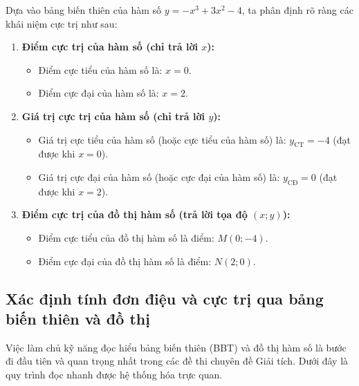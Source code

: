 \documentclass[12pt]{article}
\begin{document}
	\begin{loigiai}
		Dựa vào bảng biến thiên của hàm số $y = -x^3 + 3x^2 - 4$, ta phân định rõ ràng các khái niệm cực trị như sau:
		
		\begin{enumerate}[label=\arabic*.]
			\item \textbf{Điểm cực trị của hàm số (chỉ trả lời $x$):}
			\begin{itemize}
				\item Điểm cực tiểu của hàm số là: $x = 0$.
				\item Điểm cực đại của hàm số là: $x = 2$.
			\end{itemize}
			
			\item \textbf{Giá trị cực trị của hàm số (chỉ trả lời $y$):}
			\begin{itemize}
				\item Giá trị cực tiểu của hàm số (hoặc cực tiểu của hàm số) là: $y_{\text{CT}} = -4$ (đạt được khi $x = 0$).
				\item Giá trị cực đại của hàm số (hoặc cực đại của hàm số) là: $y_{\text{CĐ}} = 0$ (đạt được khi $x = 2$).
			\end{itemize}
			
			\item \textbf{Điểm cực trị của đồ thị hàm số (trả lời tọa độ $(x;y)$):}
			\begin{itemize}
				\item Điểm cực tiểu của đồ thị hàm số là điểm: $M(0; -4)$.
				\item Điểm cực đại của đồ thị hàm số là điểm: $N(2; 0)$.
			\end{itemize}
		\end{enumerate}
	\end{loigiai}
	
	
	\subsection{Xác định tính đơn điệu và cực trị qua bảng biến thiên và đồ thị}
	
	Việc làm chủ kỹ năng đọc hiểu bảng biến thiên (BBT) và đồ thị hàm số là bước đi đầu tiên và quan trọng nhất trong các đề thi chuyên đề Giải tích. Dưới đây là quy trình đọc nhanh được hệ thống hóa trực quan.
	
\end{document}
